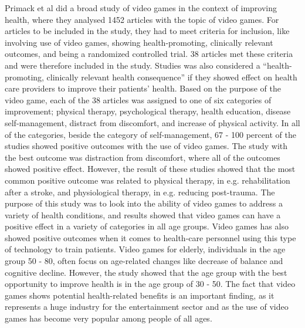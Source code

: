Primack et al did a broad study of video games in the context of improving health, where they analysed 1452 articles with the topic of video games.  For articles to be included in the study, they had to meet criteria for inclusion, like involving use of video games, showing health-promoting, clinically relevant outcomes, and being a randomized controlled trial. 38 articles met these criteria and were therefore included in the study. Studies was also considered a “health-promoting, clinically relevant health consequence” if they showed effect on health care providers to improve their patients' health. Based on the purpose of the video game, each of the 38 articles was assigned to one of six categories of improvement; physical therapy, psychological therapy, health education, disease self-management, distract from discomfort, and increase of physical activity. In all of the categories, beside the category of self-management, 67 - 100 percent of the studies showed positive outcomes with the use of video games. The study with the best outcome was distraction from discomfort, where all of the outcomes showed positive effect. However, the result of these studies showed that the most common positive outcome was related to physical therapy, in e.g. rehabilitation after a stroke, and physiological therapy, in e.g. reducing post-trauma. The purpose of this study was to look into the ability of video games to address a variety of health conditions, and results showed that video games can have a positive effect in a variety of categories in all age groups. Video games has also showed positive outcomes when it comes to health-care personnel using this type of technology to train patients. Video games for elderly, individuals in the age group 50 - 80, often focus on age-related changes like decrease of balance and cognitive decline. However, the study showed that the age group with the best opportunity to improve health is in the age group of 30 - 50. The fact that video games shows potential health-related benefits is an important finding, as it represents a huge industry for the entertainment sector and as the use of video games has become very popular among people of all ages. \cite{roleofvideogames} \\ \\
